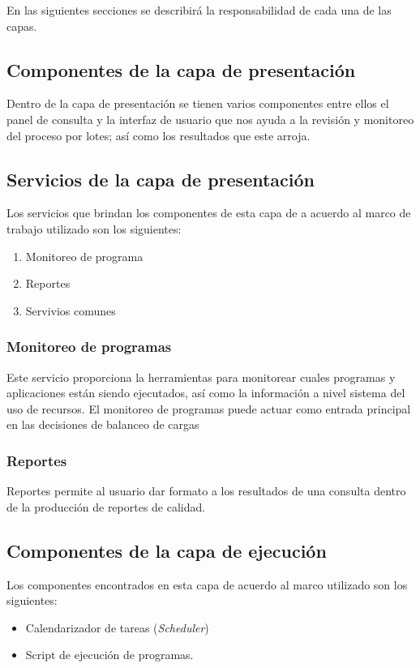 En las siguientes secciones se describirá la responsabilidad de cada una de las capas.

\subsection{Componentes de la capa de presentación}
Dentro de la capa de presentación se tienen varios componentes entre ellos el panel de consulta y la interfaz de usuario que nos ayuda a la revisión y monitoreo del proceso por lotes; así como los resultados que este arroja.

\subsection{Servicios de la capa de presentación}
Los servicios que brindan los componentes de esta capa de a acuerdo al marco de trabajo utilizado son los siguientes:

\begin{enumerate}
\item Monitoreo de programa
\item Reportes
\item Servivios comunes
\end{enumerate}

\subsubsection{Monitoreo de programas}
Este servicio proporciona la herramientas para monitorear cuales programas y aplicaciones están siendo ejecutados, así como la información a nivel sistema del uso de recursos. El monitoreo de programas puede actuar como entrada principal en las decisiones de balanceo de cargas

\subsubsection{Reportes}
Reportes permite al usuario dar formato a los resultados de una consulta dentro de la producción de reportes de calidad. 

\subsection{Componentes de la capa de ejecución}
Los componentes encontrados en esta capa de acuerdo al marco utilizado son los siguientes:

\begin{itemize}
\item Calendarizador de tareas (\emph{Scheduler})
\item Script de ejecución de programas.
\end{itemize}

